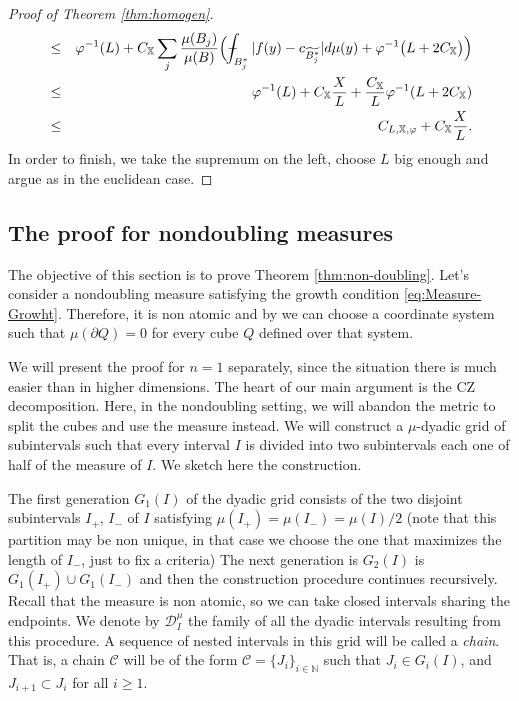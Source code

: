 \documentclass[11pt,a4paper]{amsart}
\theoremstyle{definition}
\theoremstyle{remark}
\numberwithin{equation}{section}
\def\Xint#1{\mathchoice
  {\XXint\displaystyle\textstyle{#1}}%
  {\XXint\textstyle\scriptstyle{#1}}%
  {\XXint\scriptstyle\scriptscriptstyle{#1}}%
  {\XXint\scriptscriptstyle\scriptscriptstyle{#1}}%
  \!\int}
\def\XXint#1#2#3{{\setbox0=\hbox{$#1{#2#3}{\int}$}
    \vcenter{\hbox{$#2#3$}}\kern-.5\wd0}}
\def\avgint{\Xint-}
\numberwithin{equation}{section}
\begin{document}
\begin{proof}[Proof of Theorem \ref{thm:homogen}]
\begin{eqnarray*}
%
&  \leq &\varphi^{-1} (L) + C_\mathbb{X}\sum_j \frac{\mu(B_j) }{\mu(B)}\Big( \avgint_{B_j^*}  |f(y)-c_{\widetilde{B_j^*}}| d\mu(y) + \varphi^{-1} \big( L +2 C_{\mathbb X}\big) \Big) \\
%
& \leq & \varphi^{-1}(L) +C_{\mathbb X}  \frac{X}{L }+ \frac{C_{\mathbb X}}{L} \varphi^{-1}(L+2C_{\mathbb X})  \\
%
&\leq &C_{L,\mathbb{X},\varphi} + C_{\mathbb X}  \frac{X}{L }.
\end{eqnarray*}
%
In order to finish, we take the supremum on the left, choose $L$ big enough and argue as in the euclidean case.
\end{proof}

\subsection{The proof for nondoubling measures}\label{sec:non-doubl}

The objective of this section is to prove Theorem \ref{thm:non-doubling}. Let's consider a nondoubling measure satisfying the growth condition \eqref{eq:Measure-Growht}. Therefore, it is non atomic and by \cite[Theorem 2]{MMNO} we can choose a coordinate system such that $\mu(\partial Q)=0$ for every cube $Q$ defined over that system.

We will present the proof for $n=1$ separately, since the situation there is much easier than in higher dimensions.
The heart of our main argument is the CZ decomposition. Here, in the nondoubling setting, we will abandon the metric to split the cubes and use the measure instead. We will construct a $\mu$-dyadic grid of subintervals such that every interval $I$ is divided into two subintervals each one of half of the measure of $I$. We sketch here the construction.

The first generation $G_1(I)$ of the dyadic grid  consists of the two disjoint subintervals $I_+$, $I_-$ of $I$ satisfying $\mu(I_+) = \mu(I_-) = \mu(I)/2$ (note that this partition may be non unique, in that case we choose the one that maximizes the length of $I_-$, just to fix a criteria) The next generation is $G_2(I)$ is $G_1(I_+)\cup G_1(I_-)$ and then the construction procedure continues recursively. Recall that the measure is non atomic, so we can take closed intervals sharing the endpoints. We denote by $\mathcal{D}_{I}^\mu$ the family of all the dyadic intervals resulting from this procedure. 
A sequence of nested intervals in this grid will be called a \emph{chain}. That is, a chain $\mathcal{C}$ will be of the form $\mathcal{C}=\{J_i\}_{i\in\mathbb N}$ such that $J_i\in G_i(I)$, and $J_{i+1}\subset J_i$ for all $i\ge1$.  
\end{document}
